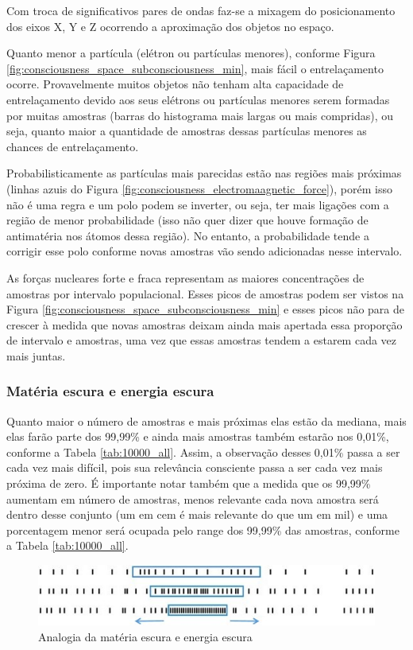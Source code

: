 Com troca de significativos pares de ondas faz-se a mixagem do posicionamento dos eixos X, Y e Z ocorrendo a aproximação dos objetos no espaço. 

Quanto menor a partícula (elétron ou partículas menores), conforme Figura \ref{fig:consciousness_space_subconsciousness_min}, mais fácil o entrelaçamento ocorre. Provavelmente muitos objetos não tenham alta capacidade de entrelaçamento devido aos seus elétrons ou partículas menores serem formadas por muitas amostras (barras do histograma mais largas ou mais compridas), ou seja, quanto maior a quantidade de amostras dessas partículas menores as chances de entrelaçamento.

Probabilisticamente as partículas mais parecidas estão nas regiões mais próximas (linhas azuis do Figura \ref{fig:consciousness_electromaagnetic_force}), porém isso não é uma regra e um polo podem se inverter, ou seja, ter mais ligações com a região de menor probabilidade (isso não quer dizer que houve formação de antimatéria nos átomos dessa região). No entanto, a probabilidade tende a corrigir esse polo conforme novas amostras vão sendo adicionadas nesse intervalo. 

As forças nucleares forte e fraca representam as maiores concentrações de amostras por intervalo populacional. Esses picos de amostras podem ser vistos na Figura \ref{fig:consciousness_space_subconsciousness_min} e esses picos não para de crescer à medida que novas amostras deixam ainda mais apertada essa proporção de intervalo e amostras, uma vez que essas amostras tendem a estarem cada vez mais juntas.

\subsubsection{Matéria escura e energia escura}
Quanto maior o número de amostras e mais próximas elas estão da mediana, mais elas farão parte dos 99,99\% e ainda mais amostras também estarão nos 0,01\%, conforme a Tabela \ref{tab:10000_all}. Assim, a observação desses 0,01\% passa a ser cada vez mais difícil, pois sua relevância consciente passa a ser cada vez mais próxima de zero. É importante notar também que a medida que os 99,99\% aumentam em número de amostras, menos relevante cada nova amostra será dentro desse conjunto (um em cem é mais relevante do que um em mil) e uma porcentagem menor será ocupada pelo range dos 99,99\% das amostras, conforme a Tabela \ref{tab:10000_all}.

\begin{figure}[H]
\caption{Analogia da matéria escura e energia escura}
\label{fig:consciousness_dark_matter_dark_energy}
\centering
\includegraphics[scale=1]{sections/images/consciousness_dark_matter_dark_energy.jpg}
\end{figure}


